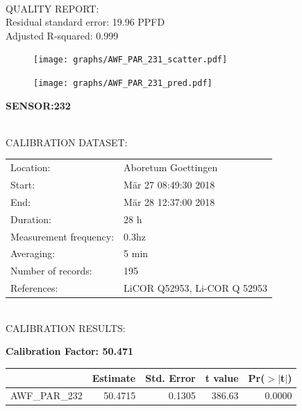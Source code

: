 \documentclass[oneside]{report}
\begin{document}
\hrulefill\\
QUALITY REPORT:\\
Residual standard error: 19.96 PPFD\\
Adjusted R-squared: 0.999



\begin{figure}[H]
  \centering
  \texttt{[image: graphs/AWF\_PAR\_231\_scatter.pdf]}
\end{figure}




\begin{figure}[H]
  \centering
  \texttt{[image: graphs/AWF\_PAR\_231\_pred.pdf]}
\end{figure}

\pagebreak


\begin{center}
\large{\textbf{SENSOR:232}}\\
\end{center}

\hrulefill\\
CALIBRATION DATASET:\\
\begin{table}[h!]
  \centering
  \label{tab:table1}
  \begin{tabular}{ll}
    Location: & Aboretum Goettingen\\ 
    
    
    Start:  & Mär 27 08:49:30 2018 \\
    End:   & Mär 28 12:37:00 2018\\ 
    Duration: & 28 h\\
    Measurement frequency: & 0.3hz\\
    Averaging:  &5 min\\
    Number of records: & 195 \\
    References: & LiCOR Q52953, Li-COR Q 52953 \\
  \end{tabular}
\end{table}

\hrulefill\\
CALIBRATION RESULTS:\\


\begin{center}
\textbf{\large{Calibration Factor: 50.471}}\\
\end{center}
\begin{table}[ht]
\centering
\begin{tabular}{rrrrr}
  \hline
 & Estimate & Std. Error & t value & Pr($>$$|$t$|$) \\ 
  \hline
AWF\_PAR\_232 & 50.4715 & 0.1305 & 386.63 & 0.0000 \\ 
   \hline
\end{tabular}
\end{table}
\end{document}
